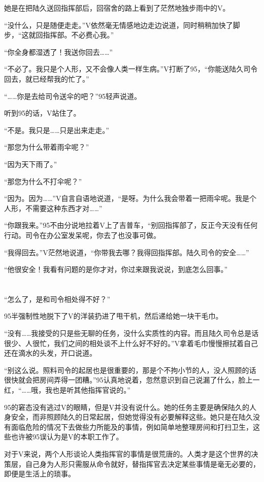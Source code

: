 她是在把陆久送回指挥部后，回宿舍的路上看到了茫然地独步雨中的V。

“没什么，只是随便走走。”V依然毫无情感地边走边说道，同时稍稍加快了脚步，“这就回指挥部。不必费心我。”

“你全身都湿透了！我送你回去……”

“不必了。我只是个人形，又不会像人类一样生病。”V打断了95，“你能送陆久司令回去，就已经帮我的忙了。”

“……你是去给司令送伞的吧？”95轻声说道。

听到95的话，V站住了。

“不是。我只是……只是出来走走。”

“那您为什么带着雨伞呢？”

“因为天下雨了。”

“那您为什么不打伞呢？”

“因为。因为……”V自言自语地说道，“是呀。为什么我会带着一把雨伞呢。我是个人形，不需要这种东西才对……”

“你跟我来。”95不由分说地拉着V上了吉普车，“别回指挥部了，反正今天没有任何行动。司令在办公室发呆呢，你去了也没事可做。

“我得回去。”V茫然地说道，“你带我去哪？我得回指挥部。陆久司令的安全……”

“他很安全！我看有问题的是你才对，你过来跟我说说，到底怎么回事。”



\section*{}

“怎么了，是和司令相处得不好？”

95半强制性地脱下了V的洋装扔进了甩干机，然后递给她一块干毛巾。

“没有……我接受的只是些无聊的任务，没什么实质性的内容。而且陆久司令总是话很少、人很忙，我们之间的相处谈不上什么好不好的。”V拿着毛巾慢慢擦拭着自己还在滴水的头发，开口说道。

“别这么说。照料司令的起居也是很重要的，那是个不拘小节的人，没人照顾的话很快就会把房间弄得一团糟。”95认真地说着，忽然意识到自己说漏了什么，脸上一红，“……哦，我也是听其他指挥官说的。”

95的窘态没有逃过V的眼睛，但是V并没有说什么。她的任务主要是确保陆久的人身安全，而非照顾陆久的日常起居，但她觉得没有必要解释这些。她只是在陆久没有面临危险的情况下去做些力所能及的事情，例如简单地整理房间和打扫卫生，这些也许被95误认为是V的本职工作了。

对于V来说，两个人形谈论人类指挥官的事情是很荒唐的。人类才是这个世界的决策层，自己身为人形只需服从命令就好，替指挥官去决定某些事情是毫无必要的，即便是生活上的琐事。

